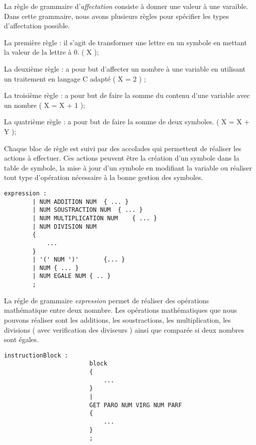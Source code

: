 La règle de grammaire d'\textit{affectation} consiste à donner une valeur à une varaible. Dans cette grammaire, nous avons plusieurs règles pour spécifier les types d'affectation possible.

La première règle : il s'agit de transformer une lettre en un symbole en mettant la valeur de la lettre à 0. ( X );

La deuxième règle : a pour but d'affecter un nombre à une variable en utilisant un traitement en langage C adapté ( X = 2 ) ;

La troisième règle : a pour but de faire la somme du contenu d'une  variable avec un nombre ( X = X + 1 );

La quatrième règle : a pour but de faire la somme de deux symboles. ( X = X + Y );

Chaque bloc de règle est suivi par des accolades qui permettent de réaliser les actions à effectuer. Ces actions peuvent être la création d'un symbole dans la table de symbole, la mise à jour d'un symbole en modifiant la variable ou réaliser tout type d'opération nécessaire à la bonne gestion des symboles.


\newpage
\lstset{style=mystyle}
\begin{lstlisting}[caption=Expression de calcul pour les nombres]
    expression : 
        | NUM ADDITION NUM	{ ... }
        | NUM SOUSTRACTION NUM	{ ... }
        | NUM MULTIPLICATION NUM	{ ... }
        | NUM DIVISION NUM	
        {
            ...
        }
        | '(' NUM ')'		{... }
        | NUM { ... }
        | NUM EGALE NUM { .. }
        ;
\end{lstlisting}

La régle de grammaire \textit{expression} permet de réaliser des opérations mathématique entre deux nomnbre.
Les opérations mathématiques que nous pouvons réaliser sont les additions, les soustractions, les multiplication, les divisions ( avec verification des diviseurs ) ainsi que comparée si deux nombres sont égales.

\lstset{style=mystyle}
\begin{lstlisting}[caption=instruction pour un Block]
    instructionBlock : 
                        block
                        {
                            ...
                        }
                        |
                        GET PARO NUM VIRG NUM PARF 
                        {
                            ...
                        }
                        ;
\end{lstlisting}

